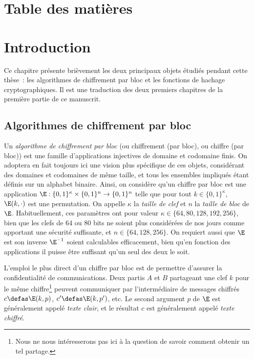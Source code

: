 

\cleardoublepage
\chapter*{Table des matières}
\parttoc


\chapter[Introduction]{Introduction}

Ce chapitre présente brièvement les deux principaux objets étudiés pendant cette thèse~: les algorithmes
de chiffrement par bloc et les fonctions de hachage cryptographiques. Il est une traduction
des deux premiers chapitres de la première partie de ce manuscrit.

\medskip

\begin{center}
\aldineleft
\end{center}

\medskip


\section{Algorithmes de chiffrement par bloc}

Un \emph{algorithme de chiffrement par bloc} (ou chiffrement (par bloc), ou chiffre (par bloc)) est une famille d'applications
injectives de domaine et codomaine finis. On adoptera en fait toujours ici une vision plus spécifique de ces objets,
considérant des domaines et codomaines de même taille, et tous les ensembles impliqués étant définis sur un alphabet
binaire. Ainsi, on considère qu'un chiffre par bloc est une application
$\E : \{0,1\}^\kappa \times \{0,1\}^n \rightarrow \{0,1\}^n$
telle que pour tout $k \in \{0,1\}^\kappa$, $\E(k,\cdot)$ est une permutation.
On appelle
$\kappa$ la \emph{taille de clef} et $n$ la \emph{taille de bloc} de $\E$. Habituellement, ces paramètres ont pour valeur
$\kappa \in \{64, 80, 128, 192, 256\}$, bien que les clefs de 64 ou 80 bits ne soient plus considérées de nos jours
comme apportant une sécurité suffisante, et 
$n \in \{64, 128, 256\}$.
On requiert aussi que $\E$ est son inverse $\E^{-1}$ soient calculables efficacement, bien qu'en fonction des applications
il puisse être suffisant qu'un seul des deux le soit. 

L'emploi le plus direct d'un chiffre par bloc est de permettre d'assurer la confidentialité de communications.
Deux partis $A$ et $B$ partageant une clef $k$ pour le même chiffre\footnote{Nous ne nous intéresserons pas ici à la question de savoir
comment obtenir un tel partage.} peuvent communiquer par l'intermédiaire de messages chiffrés $c \defas \E(k,p)$,
$c' \defas \E(k,p')$, etc. Le second argument $p$ de $\E$ est généralement appelé 
\emph{texte clair}, et le résultat $c$ est généralement appelé \emph{texte chiffré}.

